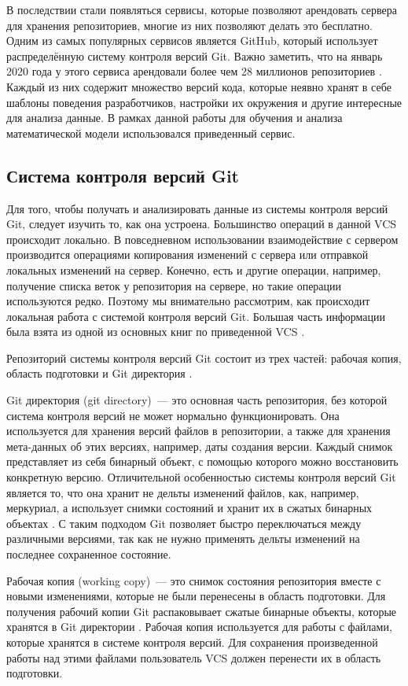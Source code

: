 В последствии стали появляться сервисы, которые позволяют арендовать сервера для хранения репозиториев, многие из них позволяют делать это бесплатно. Одним из самых популярных сервисов является GitHub, который использует распределённую систему контроля версий Git. Важно заметить, что на январь 2020 года у этого сервиса арендовали более чем 28 миллионов репозиториев \cite{github-repo-count}. Каждый из них содержит множество версий кода, которые неявно хранят в себе шаблоны поведения разработчиков, настройки их окружения и другие интересные для анализа данные. В рамках данной работы для обучения и анализа математической модели использовался приведенный сервис.
    \subsection{Система контроля версий Git}
Для того, чтобы получать и анализировать данные из системы контроля версий Git, следует изучить то, как она устроена. Большинство операций в данной VCS происходит локально. В повседневном использовании взаимодействие с сервером производится операциями копирования изменений с сервера или отправкой локальных изменений на сервер. Конечно, есть и другие операции, например, получение списка веток у репозитория на сервере, но такие операции используются редко. Поэтому мы внимательно рассмотрим, как происходит локальная работа с системой контроля версий Git. Большая часть информации была взята из одной из основных книг по приведенной VCS \cite{pro-git}.

Репозиторий системы контроля версий Git состоит из трех частей: рабочая копия, область подготовки и Git директория \cite{pro-git}. 

Git директория (git directory)~--- это основная часть репозитория, без которой система контроля версий не может нормально функционировать. Она используется для хранения версий файлов в репозитории, а также для хранения мета-данных об этих версиях, например, даты создания версии. Каждый снимок представляет из себя бинарный объект, с помощью которого можно восстановить конкретную версию. Отличительной особенностью системы контроля версий Git является то, что она хранит не дельты изменений файлов, как, например, меркуриал, а использует снимки состояний и хранит их в сжатых бинарных объектах \cite{pro-git}. С таким подходом Git позволяет быстро переключаться между различными версиями, так как не нужно применять дельты изменений на последнее сохраненное состояние.

Рабочая копия (working copy)~--- это снимок состояния репозитория вместе с новыми изменениями, которые не были перенесены в область подготовки. Для получения рабочий копии Git распаковывает сжатые бинарные объекты, которые хранятся в Git директории \cite{pro-git}. Рабочая копия используется для работы с файлами, которые хранятся в системе контроля версий. Для сохранения произведенной работы над этими файлами пользователь VCS должен перенести их в область подготовки.

